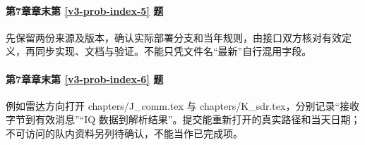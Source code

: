 \paragraph*{第7章章末第 \ref{v3-prob-index-5} 题}
\begin{solution}
先保留两份来源及版本，确认实际部署分支和当年规则，由接口双方核对有效定义，再同步实现、文档与验证。不能只凭文件名“最新”自行混用字段。
\end{solution}

\paragraph*{第7章章末第 \ref{v3-prob-index-6} 题}
\begin{solution}
例如雷达方向打开 chapters/J\_comm.tex 与 chapters/K\_sdr.tex，分别记录“接收字节到有效消息”“IQ 数据到解析结果”。提交能重新打开的真实路径和当天日期；不可访问的队内资料另列待确认，不能当作已完成项。
\end{solution}

\endgroup
